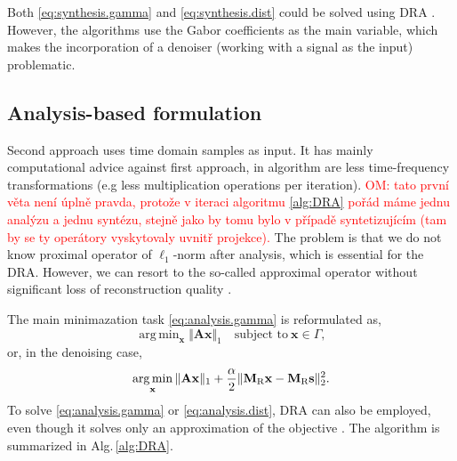 \documentclass[conference]{IEEEtran}
\newcommand{\todo}[1]{\textcolor{red}{#1}}
\begin{document}
%
Both \eqref{eq:synthesis.gamma} and \eqref{eq:synthesis.dist} could be solved using DRA \cite{Mokry2020, Zaviska2021}.
However, the algorithms use the Gabor coefficients as the main variable, which makes the incorporation of a denoiser (working with a signal as the input) problematic.


\subsection{Analysis-based formulation}\label{subsec:timecoef}

Second approach uses time domain samples as input.
It has mainly computational advice against first approach, in algorithm are less time-frequency transformations (e.g less multiplication operations per iteration).
\todo{OM: tato první věta není úplně pravda, protože v iteraci algoritmu \ref{alg:DRA} pořád máme jednu analýzu a jednu syntézu, stejně jako by tomu bylo v případě syntetizujícím (tam by se ty operátory vyskytovaly uvnitř projekce).}
The problem is 
that we do not know proximal operator of $ \ell_1 $-norm after analysis, which is essential for the DRA.
However, we can resort to the so-called approximal operator without significant loss of reconstruction quality \cite{Mokry2021}.

The main minimazation task \eqref{eq:analysis.gamma} is reformulated as,
\begin{equation}
	\label{eq:analysis.gamma}
	\mathop {\operatorname{arg \, min}}_\mathbf {x}\Vert \mathbf{A} \mathbf {x}\Vert _1 \quad \text{subject to}\ \mathbf {x}\in \Gamma,
\end{equation}
or, in the denoising case,
\begin{equation}
	\label{eq:analysis.dist}
	\mathop {\operatorname{arg \, min}}_\mathbf {x}\Vert \mathbf{A} \mathbf {x}\Vert _1 + \frac{\alpha}{2} \Vert \mathbf{M}_{\textup{R}} \mathbf {x} - \mathbf{M}_{\textup{R}} \mathbf{s} \Vert^2_2.
\end{equation} 
To solve \eqref{eq:analysis.gamma} or \eqref{eq:analysis.dist}, DRA can also be employed, even though it solves only an approximation of the objective \cite{Mokry2021}.
The algorithm is summarized in Alg.\,\ref{alg:DRA}.
\end{document}
